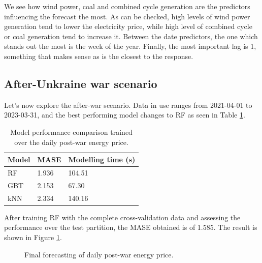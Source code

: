 We see how wind power, coal and combined cycle generation are the predictors influencing the forecast the most. As can be checked, high levels of wind power generation tend to lower the electricity price, while high level of combined cycle or coal generation tend to increase it. Between the date predictors, the one which stands out the most is the week of the year. Finally, the most important lag is 1, something that makes sense as is the closest to the response.

\subsection{After-Unkraine war scenario}
Let's now explore the after-war scenario. Data in use ranges from 2021-04-01 to 2023-03-31, and the best performing model changes to RF as seen in Table \ref{tab:cv-daily-post}.

\begin{table}[H]
\centering
\begin{tabular}{@{}l|l|l@{}}
\toprule
Model & MASE  & Modelling time (s)  \\ \midrule
RF    & 1.936 & 104.51  \\
GBT   & 2.153 & 67.30   \\
kNN   & 2.334 & 140.16  \\ \bottomrule
\end{tabular}
\caption{Model performance comparison trained over the daily post-war energy price.}
\label{tab:cv-daily-post}
\end{table}

After training RF with the complete cross-validation data and assessing the performance over the test partition, the MASE obtained is of 1.585. The result is shown in Figure \ref{fig:forecast-daily-post}.

\begin{figure}[H]
\centering
    \caption{Final forecasting of daily post-war energy price.}
    \label{fig:forecast-daily-post}
\end{figure}

